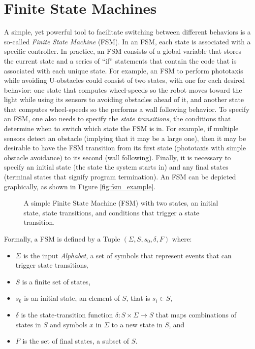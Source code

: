 \section{Finite State Machines}\label{sec:fsm}
A simple, yet powerful tool to facilitate switching between different behaviors is a so-called \emph{Finite State Machine} (FSM). In an FSM, each state is associated with a specific controller. In practice, an FSM consists of a global variable that stores the current state and a series of ``if'' statements that contain the code that is associated with each unique state. For example, an FSM to perform phototaxis while avoiding U-obstacles could consist of two states, with one for each desired behavior: one state that computes wheel-speeds so the robot moves toward the light while using its sensors to avoiding obstacles ahead of it, and another state that computes wheel-speeds so the performs a wall following behavior. To specify an FSM, one also needs to specify the \emph{state transitions}, the conditions that determine when to switch which state the FSM is in. For example, if multiple sensors detect an obstacle (implying that it may be a large one), then it may be desirable to have the FSM transition from its first state (phototaxis with simple obstacle avoidance) to its second (wall following). Finally, it is necessary to specify an initial state (the state the system starts in) and any final states (terminal states that signify program termination). An FSM can be depicted graphically, as shown in Figure \ref{fig:fsm_example}.

\begin{figure}
\caption{A simple Finite State Machine (FSM) with two states, an initial state, state transitions, and conditions that trigger a state transition.}
\end{figure}

Formally, a FSM is defined by a Tuple $(\Sigma, S, s_0, \delta, F)$ where:
\begin{itemize}
\item $\Sigma$ is the input \emph{Alphabet}, a set of symbols that represent events that can trigger state transitions,
\item $S$ is a finite set of states,
\item $s_0$ is an initial state, an element of $S$, that is $s_i \in S$,
\item $\delta$ is the state-transition function $\delta: S \times \Sigma \rightarrow S$ that maps combinations of states in $S$ and symbols $x$ in $\Sigma$ to a new state in $S$, and
\item $F$ is the set of final states, a subset of $S$. 
\end{itemize}

